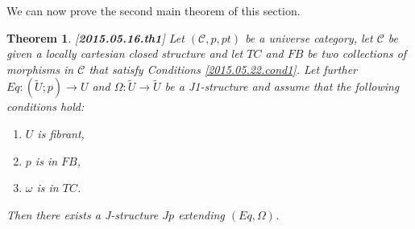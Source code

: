 \documentclass[12pt]{article}
\newtheorem{theorem}[proposition]{Theorem}
\newcommand{\llabel}[1]{\label{#1}[{\bf #1}]}
\newcommand{\sr}{\rightarrow}
\newcommand{\wt}{\widetilde}
\begin{document}
%















We can now prove the second main theorem of this section.
%
\begin{theorem}
\llabel{2015.05.16.th1}
Let $({\mathcal C},p,pt)$ be a universe category, let $\mathcal C$ be given a locally cartesian closed structure and let $TC$ and $FB$ be two collections of morphisms in $\mathcal C$ that satisfy Conditions \ref{2015.05.22.cond1}. Let further $Eq:(\wt{U};p)\sr U$ and $\Omega:\wt{U}\sr \wt{U}$ be a J1-structure and assume that the following conditions hold:
%
\begin{enumerate}
\item $U$ is fibrant,
\item $p$ is in $FB$,
\item $\omega$ is in $TC$.
\end{enumerate}
%
Then there exists a J-structure $Jp$ extending $(Eq,\Omega)$.
\end{theorem}
%
\end{document}
